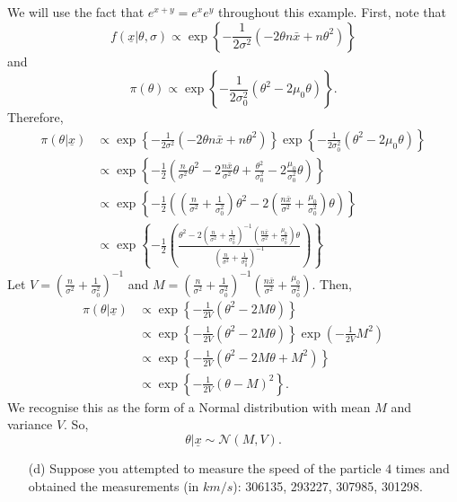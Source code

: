 {{    We will use the fact that $e^{x+y} = e^x e^y$ throughout this example. First, note that
    $$ f(\underline{x}|\theta, \sigma) \propto \exp\left\{-\frac{1}{2\sigma^2}(-2\theta n\bar{x} + n\theta^2)\right\} $$
    and
    $$ \pi(\theta) \propto \exp\left\{-\frac{1}{2\sigma^2_0}(\theta^2 - 2 \mu_0 \theta)\right\}. $$
    Therefore,
    \begin{align*}
        \pi(\theta|\underline{x}) &\propto \exp\left\{-\frac{1}{2\sigma^2}(-2\theta n\bar{x} + n\theta^2)\right\}\exp\left\{-\frac{1}{2\sigma^2_0}(\theta^2 - 2 \mu_0 \theta)\right\} \\
        &\propto \exp\left\{-\frac{1}{2}\left(\frac{n}{\sigma^2} \theta^2 - 2 \frac{n\bar{x}}{\sigma^2}\theta + \frac{\theta^2}{\sigma_0^2} - 2\frac{\mu_0}{\sigma_0^2} \theta \right)\right\} \\
        &\propto \exp\left\{-\frac{1}{2}\left(\left(\frac{n}{\sigma^2} + \frac{1}{\sigma_0^2}\right)\theta^2 - 2\left(\frac{n\bar{x}}{\sigma^2} + \frac{\mu_0}{\sigma_0^2}\right)\theta\right)\right\} \\
        &\propto \exp\left\{-\frac{1}{2}\left(\frac{\theta^2 - 2\left(\frac{n}{\sigma^2} + \frac{1}{\sigma_0^2}\right)^{-1}\left(\frac{n\bar{x}}{\sigma^2} + \frac{\mu_0}{\sigma_0^2}\right)\theta }{\left(\frac{n}{\sigma^2} + \frac{1}{\sigma_0^2}\right)^{-1}}\right)\right\}
    \end{align*}
    Let $V = \left(\frac{n}{\sigma^2} + \frac{1}{\sigma_0^2}\right)^{-1}$ and $M = \left(\frac{n}{\sigma^2} + \frac{1}{\sigma_0^2}\right)^{-1}\left(\frac{n\bar{x}}{\sigma^2} + \frac{\mu_0}{\sigma_0^2}\right)$. Then,
    \begin{align*}
        \pi(\theta|\underline{x}) &\propto \exp\left\{-\frac{1}{2V}(\theta^2 - 2M\theta)\right\} \\
        &\propto \exp\left\{-\frac{1}{2V}(\theta^2 - 2M\theta)\right\} \exp\left(-\frac{1}{2V}M^2\right) \\
        &\propto \exp\left\{-\frac{1}{2V}(\theta^2 - 2M\theta + M^2)\right\} \\
        &\propto \exp\left\{-\frac{1}{2V}(\theta - M)^2\right\}.
    \end{align*}
    We recognise this as the form of a Normal distribution with mean $M$ and variance $V$. So, 
    $$ \theta |\underline{x} \sim \mathcal{N}(M,V).$$
    
}

\clearpage

\begin{itemize}
\item [(d)] Suppose you attempted to measure the speed of the particle $4$ times and obtained the measurements (in $km/s$): 306135, 293227, 307985, 301298.


\end{itemize}}
